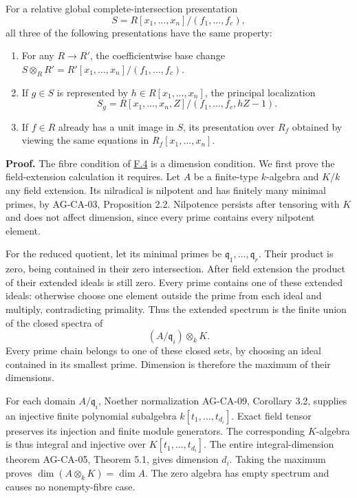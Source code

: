 \documentclass[11pt,a4paper,openany]{report}
\newcounter{none}
\providecommand{\tightlist}{\setlength{\itemsep}{0pt}\setlength{\parskip}{0pt}}
\begin{document}
For a relative global complete-intersection presentation \[S=R[x_1,\ldots,x_n]/(f_1,\ldots,f_c),\] all three of the following presentations have the same property:

\begin{enumerate}
\def\labelenumi{\arabic{enumi}.}
\tightlist
\item
  For any \(R\to R'\), the coefficientwise base change \(S\otimes_RR'=R'[x_1,\ldots,x_n]/(f_1,\ldots,f_c)\).
\item
  If \(g\in S\) is represented by \(h\in R[x_1,\ldots,x_n]\), the principal localization \[S_g=R[x_1,\ldots,x_n,Z]/(f_1,\ldots,f_c,hZ-1).\]
\item
  If \(f\in R\) already has a unit image in \(S\), its presentation over \(R_f\) obtained by viewing the same equations in \(R_f[x_1,\ldots,x_n]\).
\end{enumerate}

\textbf{Proof.} The fibre condition of \hyperref[AG-RG-S05-algebra-definition-relative-global-complete-intersection]{F.4} is a dimension condition. We first prove the field-extension calculation it requires. Let \(A\) be a finite-type \(k\)-algebra and \(K/k\) any field extension. Its nilradical is nilpotent and has finitely many minimal primes, by AG-CA-03, Proposition 2.2. Nilpotence persists after tensoring with \(K\) and does not affect dimension, since every prime contains every nilpotent element.

For the reduced quotient, let its minimal primes be \(\mathfrak q_1,\ldots,\mathfrak q_r\). Their product is zero, being contained in their zero intersection. After field extension the product of their extended ideals is still zero. Every prime contains one of these extended ideals: otherwise choose one element outside the prime from each ideal and multiply, contradicting primality. Thus the extended spectrum is the finite union of the closed spectra of \[(A/\mathfrak q_i)\otimes_kK.\] Every prime chain belongs to one of these closed sets, by choosing an ideal contained in its smallest prime. Dimension is therefore the maximum of their dimensions.

For each domain \(A/\mathfrak q_i\), Noether normalization AG-CA-09, Corollary 3.2, supplies an injective finite polynomial subalgebra \(k[t_1,\ldots,t_{d_i}]\). Exact field tensor preserves its injection and finite module generators. The corresponding \(K\)-algebra is thus integral and injective over \(K[t_1,\ldots,t_{d_i}]\). The entire integral-dimension theorem AG-CA-05, Theorem 5.1, gives dimension \(d_i\). Taking the maximum proves \(\dim(A\otimes_kK)=\dim A\). The zero algebra has empty spectrum and causes no nonempty-fibre case.
\end{document}
